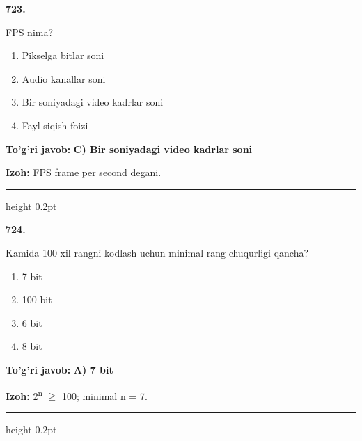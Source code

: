 \documentclass[10pt,a4paper,oneside]{article}
\begin{document}
\noindent\textbf{\color{ink}723.}
\par
FPS nima?
\begin{enumerate}[label=\Alph*),leftmargin=9mm]
\item Pikselga bitlar soni
\item Audio kanallar soni
\item Bir soniyadagi video kadrlar soni
\item Fayl siqish foizi
\end{enumerate}
\begin{tcolorbox}[enhanced,breakable,colback=teal!4,colframe=teal!50!black,boxrule=0.5pt,arc=1.1mm,left=3mm,right=3mm,top=1.7mm,bottom=1.7mm,before skip=2mm,after skip=2mm]
\textbf{\color{teal}To'g'ri javob:} \textbf{C) Bir soniyadagi video kadrlar soni}
\par\smallskip
\textbf{Izoh:} FPS frame per second degani.
\end{tcolorbox}
\vspace{2mm}\hrule height 0.2pt \vspace{3mm}

\noindent\textbf{\color{ink}724.}
\par
Kamida 100 xil rangni kodlash uchun minimal rang chuqurligi qancha?
\begin{enumerate}[label=\Alph*),leftmargin=9mm]
\item 7 bit
\item 100 bit
\item 6 bit
\item 8 bit
\end{enumerate}
\begin{tcolorbox}[enhanced,breakable,colback=teal!4,colframe=teal!50!black,boxrule=0.5pt,arc=1.1mm,left=3mm,right=3mm,top=1.7mm,bottom=1.7mm,before skip=2mm,after skip=2mm]
\textbf{\color{teal}To'g'ri javob:} \textbf{A) 7 bit}
\par\smallskip
\textbf{Izoh:} 2\textsuperscript{n} \ensuremath{\geq} 100; minimal n = 7.
\end{tcolorbox}
\vspace{2mm}\hrule height 0.2pt \vspace{3mm}
\end{document}
